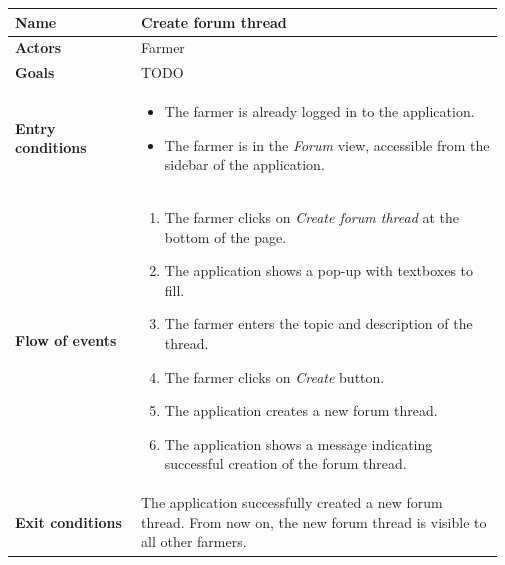 \begin{table}[H]
    \centering
	\begin{tabular}{@{}p{0.25\linewidth} p{0.72\linewidth}@{}}
\toprule
		\textbf{Name}               & Create forum thread\\
		\midrule
		\textbf{Actors}             & Farmer\\
		\midrule
		\textbf{Goals}              & TODO \\
		\midrule
		
		\textbf{Entry conditions}   & \begin{itemize}[leftmargin=.4cm,noitemsep,topsep=0pt,before=\vspace{-3mm},after=\vspace{-4mm}]
		    \item The farmer is already logged in to the application.
		    \item The farmer is in the \textit{Forum} view, accessible from the sidebar of the application.
		\end{itemize}\\
		\midrule
		
		\textbf{Flow of events}     & \begin{enumerate}[leftmargin=.4cm,noitemsep,topsep=0pt,before=\vspace{-3mm},after=\vspace{-4mm}]
		    \item The farmer clicks on \textit{Create forum thread} at the bottom of the page.
		    \item The application shows a pop-up with textboxes to fill.
		    \item The farmer enters the topic and description of the thread.
		    \item The farmer clicks on \textit{Create} button.
		    \item The application creates a new forum thread.
		    \item The application shows a message indicating successful creation of the forum thread.
		\end{enumerate}\\
		\midrule
		\textbf{Exit conditions}    & The application successfully created a new forum thread. From now on, the new forum thread is visible to all other farmers. \\
		\midrule
		

\end{tabular}
\end{table}
